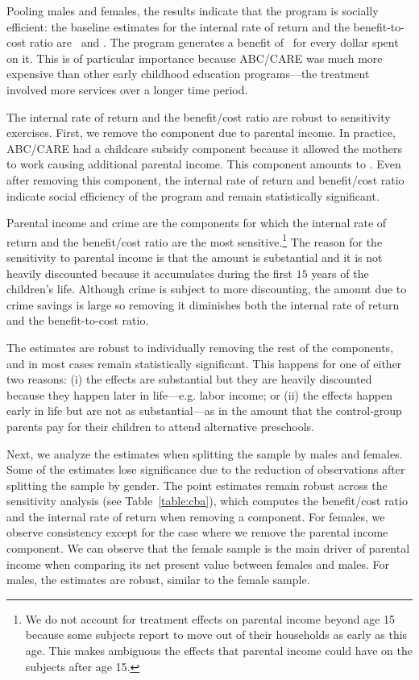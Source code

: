 Pooling males and females, the results indicate that the program is socially efficient: the baseline estimates for the internal rate of return and the benefit-to-cost ratio are \irrp\ and \bcp. The program generates a benefit of \bcp\ for every dollar spent on it. This is of particular importance because ABC/CARE was much more expensive than other early childhood education programs---the treatment involved more services over a longer time period.\citet{Elango_Hojman_etal_2016_Early-Edu}

The internal rate of return and the benefit/cost ratio are robust to sensitivity exercises. First, we remove the component due to parental income. In practice, ABC/CARE had a childcare subsidy component because it allowed the mothers to work causing additional parental income. This component amounts to \parincomenpvp. Even after removing this component, the internal rate of return and benefit/cost ratio indicate social efficiency of the program and remain statistically significant.

Parental income and crime are the components for which the internal rate of return and the benefit/cost ratio are the most sensitive.\footnote{We do not account for treatment effects on parental income beyond age 15 because some subjects report to move out of their households as early as this age. This makes ambiguous the effects that parental income could have on the subjects after age 15.} The reason for the sensitivity to parental income is that the amount is substantial and it is not heavily discounted because it accumulates during the first $15$ years of the children's life. Although crime is subject to more discounting, the amount due to crime savings is large so removing it diminishes both the internal rate of return and the benefit-to-cost ratio.

The estimates are robust to individually removing the rest of the components, and in most cases remain statistically significant. This happens for one of either two reasons: (i) the effects are substantial but they are heavily discounted because they happen later in life---e.g. labor income; or (ii) the effects happen early in life but are not as substantial---as in the amount that the control-group parents pay for their children to attend alternative preschools.

Next, we analyze the estimates when splitting the sample by males and females. Some of the estimates lose significance due to the reduction of observations after splitting the sample by gender. The point estimates remain robust across  the sensitivity analysis (see Table~\ref{table:cba}), which computes the benefit/cost ratio and the internal rate of return when removing a component. For females, we observe consistency except for the case where we remove the parental income component. We can observe that the female sample is the main driver of parental income when comparing its net present value between females and males. For males, the estimates are robust, similar to the female sample.

